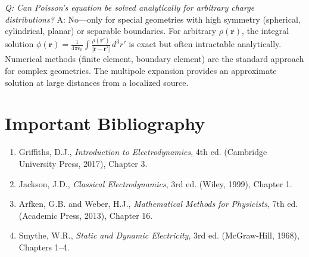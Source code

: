 \textit{Q: Can Poisson's equation be solved analytically for arbitrary charge distributions?}
A: No---only for special geometries with high symmetry (spherical, cylindrical, planar) or separable boundaries. For arbitrary $\rho(\mathbf{r})$, the integral solution $\phi(\mathbf{r}) = \frac{1}{4\pi\epsilon_0}\int\frac{\rho(\mathbf{r}')}{|\mathbf{r}-\mathbf{r}'|}\,d^3r'$ is exact but often intractable analytically. Numerical methods (finite element, boundary element) are the standard approach for complex geometries. The multipole expansion provides an approximate solution at large distances from a localized source.
\section*{Important Bibliography}
\begin{enumerate}
\item Griffiths, D.J., \textit{Introduction to Electrodynamics}, 4th ed. (Cambridge University Press, 2017), Chapter 3.
\item Jackson, J.D., \textit{Classical Electrodynamics}, 3rd ed. (Wiley, 1999), Chapter 1.
\item Arfken, G.B. and Weber, H.J., \textit{Mathematical Methods for Physicists}, 7th ed. (Academic Press, 2013), Chapter 16.
\item Smythe, W.R., \textit{Static and Dynamic Electricity}, 3rd ed. (McGraw-Hill, 1968), Chapters 1--4.
\end{enumerate}


